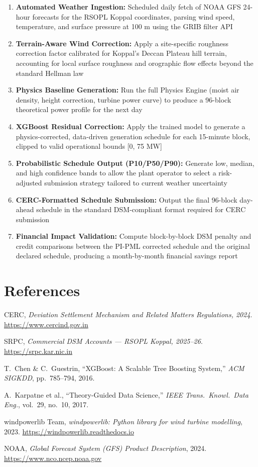 \documentclass[11pt,a4paper]{article}
\begin{document}
\begin{enumerate}
    \item \textbf{Automated Weather Ingestion:} Scheduled daily fetch of NOAA GFS 24-hour forecasts for the RSOPL Koppal coordinates, parsing wind speed, temperature, and surface pressure at 100 m using the GRIB filter API
    \item \textbf{Terrain-Aware Wind Correction:} Apply a site-specific roughness correction factor calibrated for Koppal's Deccan Plateau hill terrain, accounting for local surface roughness and orographic flow effects beyond the standard Hellman law
    \item \textbf{Physics Baseline Generation:} Run the full Physics Engine (moist air density, height correction, turbine power curve) to produce a 96-block theoretical power profile for the next day
    \item \textbf{XGBoost Residual Correction:} Apply the trained model to generate a physics-corrected, data-driven generation schedule for each 15-minute block, clipped to valid operational bounds [0, 75 MW]
    \item \textbf{Probabilistic Schedule Output (P10/P50/P90):} Generate low, median, and high confidence bands to allow the plant operator to select a risk-adjusted submission strategy tailored to current weather uncertainty
    \item \textbf{CERC-Formatted Schedule Submission:} Output the final 96-block day-ahead schedule in the standard DSM-compliant format required for CERC submission
    \item \textbf{Financial Impact Validation:} Compute block-by-block DSM penalty and credit comparisons between the PI-PML corrected schedule and the original declared schedule, producing a month-by-month financial savings report
\end{enumerate}

\section{References}

\begin{enumerate}[label={[\arabic*]}, leftmargin=*, itemsep=4pt]
    \item CERC, \textit{Deviation Settlement Mechanism and Related Matters Regulations, 2024}. \url{https://www.cercind.gov.in}
    \item SRPC, \textit{Commercial DSM Accounts --- RSOPL Koppal, 2025--26}. \url{https://srpc.kar.nic.in}
    \item T.\ Chen \& C.\ Guestrin, ``XGBoost: A Scalable Tree Boosting System,'' \textit{ACM SIGKDD}, pp.\ 785--794, 2016.
    \item A.\ Karpatne et al., ``Theory-Guided Data Science,'' \textit{IEEE Trans.\ Knowl.\ Data Eng.}, vol.\ 29, no.\ 10, 2017.
    \item windpowerlib Team, \textit{windpowerlib: Python library for wind turbine modelling}, 2023. \url{https://windpowerlib.readthedocs.io}
    \item NOAA, \textit{Global Forecast System (GFS) Product Description}, 2024. \url{https://www.nco.ncep.noaa.gov}
\end{enumerate}
\end{document}
